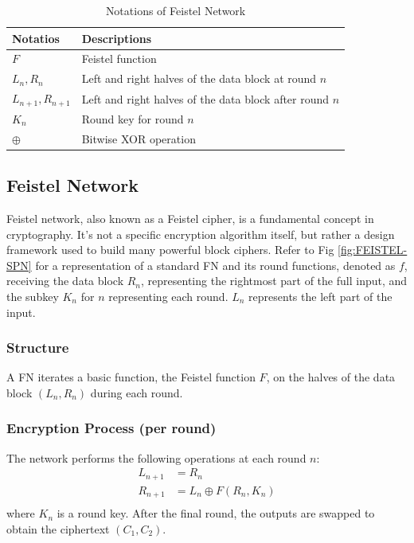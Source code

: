 \documentclass[conference]{IEEEtran}
\begin{document}
\begin{table}[ht]
    \centering
    \caption{Notations of Feistel Network}
    \begin{tabular}{ll}
        \toprule
        \textbf{Notatios} & \textbf{Descriptions} \\
        \midrule
        $F$ & Feistel function \\
        $L_n, R_n$ & Left and right halves of the data block at round $n$ \\
        $L_{n+1}, R_{n+1}$ & Left and right halves of the data block after round $n$ \\
        $K_n$ & Round key for round $n$ \\
        $\oplus$ & Bitwise XOR operation \\
        \bottomrule
    \end{tabular}
    \label{table:fn}
\end{table}

\subsection{Feistel Network}
Feistel network, also known as a Feistel cipher, is a fundamental concept in cryptography. It's not a specific encryption algorithm itself, but rather a design framework used to build many powerful block ciphers. Refer to Fig \ref{fig:FEISTEL-SPN} for a representation of a standard FN and its round functions, denoted as $f$, receiving the data block $R_n$, representing the rightmost part of the full input, and the subkey $K_n$ for $n$ representing each round. $L_n$ represents the left part of the input.
\subsubsection{Structure}
A FN iterates a basic function, the Feistel function $F$, on the halves of the data block $(L_n, R_n)$ during each round.
\subsubsection{Encryption Process (per round)}
The network performs the following operations at each round $n$:
\begin{align*}
    L_{n+1} &= R_n \\
    R_{n+1} &= L_n \oplus F(R_n, K_n) \\
\end{align*}
where $K_n$ is a round key. After the final round, the outputs are swapped to obtain the ciphertext $(C_1, C_2)$.
\end{document}
